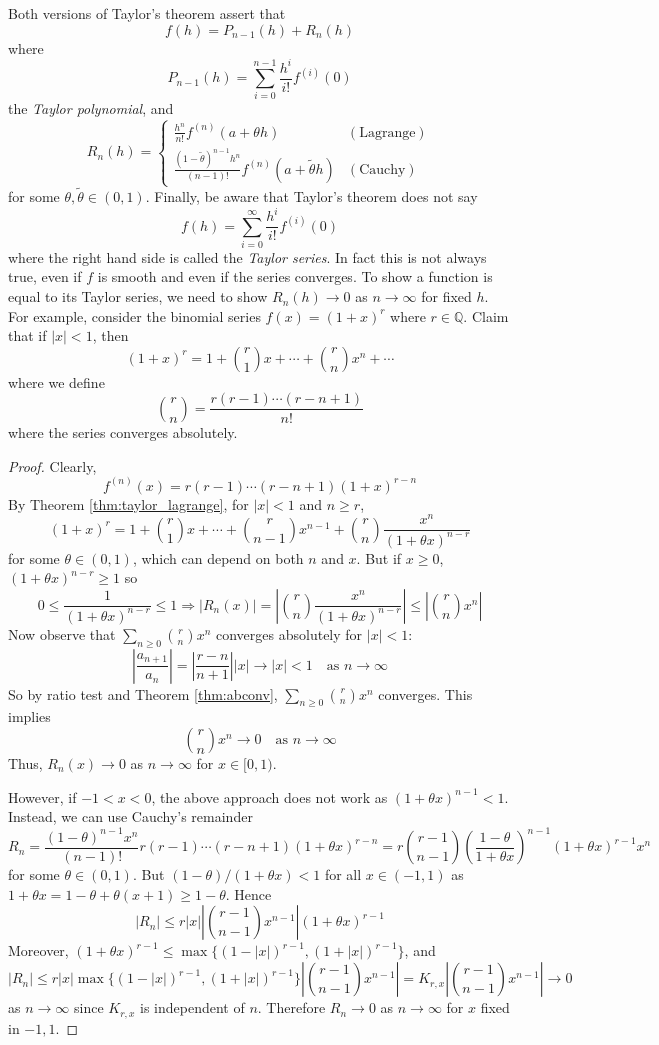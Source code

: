 \documentclass[10pt, a4paper, twoside]{report}
\begin{document}
Both versions of Taylor's theorem assert that 
\[f(h)=P_{n-1}(h)+R_n(h)\]
where 
\[P_{n-1}(h)=\sum_{i=0}^{n-1}\frac{h^i}{i!}f^{(i)}(0)\]
the \emph{Taylor polynomial}, and
\[R_n(h)=\begin{cases}
    \frac{h^n}{n!}f^{(n)}(a+\theta h) & (\text{Lagrange}) \\
    \frac{(1-\tilde{\theta})^{n-1}h^n}{(n-1)!}f^{(n)}(a+\tilde{\theta}h) & (\text{Cauchy})
\end{cases}\] 
for some \(\theta,\tilde{\theta}\in(0,1)\). Finally, be aware that Taylor's theorem does not say 
\[f(h)=\sum_{i=0}^\infty\frac{h^i}{i!}f^{(i)}(0)\]
where the right hand side is called the \emph{Taylor series}.
In fact this is not always true, even if \(f\) is smooth and even if the series converges. To show a function is equal to its Taylor series, we need to show \(R_n(h)\to 0\) as \(n\to\infty\) for fixed \(h\). For example, consider the binomial series \(f(x)=(1+x)^r\) where \(r\in\mathbb{Q}\). Claim that if \(|x|<1\), then 
\[(1+x)^r=1+\binom{r}{1}x+\cdots+\binom rnx^n+\cdots\]
where we define 
\[\binom rn=\frac{r(r-1)\cdots(r-n+1)}{n!}\]
where the series converges absolutely.
\begin{proof}
    Clearly,
    \[f^{(n)}(x)=r(r-1)\cdots(r-n+1)(1+x)^{r-n}\]
    By Theorem \ref{thm:taylor_lagrange}, for \(|x|<1\) and \(n\geq r\),
    \[(1+x)^r=1+\binom{r}{1}x+\cdots+\binom r{n-1}x^{n-1}+\binom rn\frac{x^n}{(1+\theta x)^{n-r}}\]
    for some \(\theta\in(0,1)\), which can depend on both \(n\) and \(x\). But if \(x\geq 0\), \((1+\theta x)^{n-r}\geq 1\) so 
    \[0\leq\frac{1}{(1+\theta x)^{n-r}}\leq 1\Rightarrow|R_n(x)|=\left|\binom rn\frac{x^n}{(1+\theta x)^{n-r}}\right|\leq\left|\binom rnx^n\right|\]
    Now observe that \(\sum_{n\geq 0}{\binom rnx^n}\) converges absolutely for \(|x|<1\):
    \[\left|\frac{a_{n+1}}{a_n}\right|=\left|\frac{r-n}{n+1}\right||x|\to|x|<1\quad\text{as  }n\to\infty\]
    So by ratio test and Theorem \ref{thm:abconv}, \(\sum_{n\geq 0}{\binom rnx^n}\) converges. This implies 
    \[\binom rnx^n\to 0\quad\text{as  }n\to\infty\]
    Thus, \(R_n(x)\to 0\) as \(n\to\infty\) for \(x\in[0,1)\).

    However, if \(-1<x<0\), the above approach does not work as \((1+\theta x)^{n-1}<1\). Instead, we can use Cauchy's remainder 
    \[R_n=\frac{(1-\theta)^{n-1}x^n}{(n-1)!}r(r-1)\cdots(r-n+1)(1+\theta x)^{r-n}=r\binom{r-1}{n-1}\left(\frac{1-\theta}{1+\theta x}\right)^{n-1}(1+\theta x)^{r-1}x^n\]
    for some \(\theta\in(0,1)\). But \((1-\theta)/(1+\theta x)<1\) for all \(x\in(-1,1)\) as \(1+\theta x=1-\theta +\theta(x+1)\geq 1-\theta\). Hence 
    \[|R_n|\leq r|x|\left|\binom{r-1}{n-1}x^{n-1}\right|(1+\theta x)^{r-1}\]
    Moreover, \((1+\theta x)^{r-1}\leq\max\{(1-|x|)^{r-1},(1+|x|)^{r-1}\}\), and 
    \[|R_n|\leq r|x|\max\{(1-|x|)^{r-1},(1+|x|)^{r-1}\}\left|\binom{r-1}{n-1}x^{n-1}\right|=K_{r,x}\left|\binom{r-1}{n-1}x^{n-1}\right|\to 0\] as \(n\to\infty\) since \(K_{r,x}\) is independent of \(n\). Therefore \(R_n\to 0\) as \(n\to\infty\) for \(x\) fixed in \(-1,1\).
\end{proof}
\end{document}
